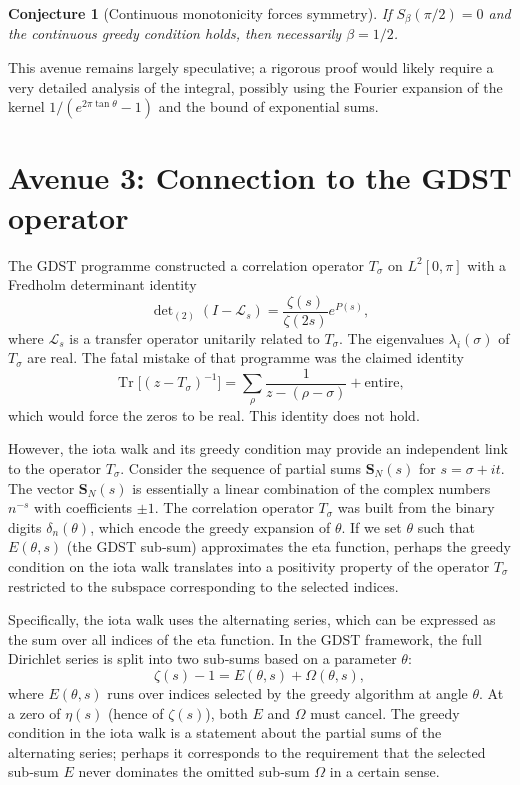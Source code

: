 \documentclass[11pt,a4paper]{article}
\newtheorem{conjecture}[theorem]{Conjecture}
\newcommand{\Tr}{\operatorname{Tr}}
\begin{document}
\begin{conjecture}[Continuous monotonicity forces symmetry]\label{conj:cont}
If $S_\beta(\pi/2) = 0$ and the continuous greedy condition holds, then necessarily $\beta = 1/2$.
\end{conjecture}

This avenue remains largely speculative; a rigorous proof would likely require a very detailed analysis of the integral, possibly using the Fourier expansion of the kernel $1/(e^{2\pi\tan\theta}-1)$ and the bound of exponential sums.

\section{Avenue 3: Connection to the GDST operator}
\label{sec:GDST}

The GDST programme constructed a correlation operator $T_\sigma$ on $L^2[0,\pi]$ with a Fredholm determinant identity
\[
\det\nolimits_{(2)}(I - \mathcal{L}_s) = \frac{\zeta(s)}{\zeta(2s)} e^{P(s)},
\]
where $\mathcal{L}_s$ is a transfer operator unitarily related to $T_\sigma$.  The eigenvalues $\lambda_i(\sigma)$ of $T_\sigma$ are real.  The fatal mistake of that programme was the claimed identity
\[
\Tr\bigl[ (z - T_\sigma)^{-1} \bigr] = \sum_{\rho} \frac{1}{z - (\rho-\sigma)} + \text{entire},
\]
which would force the zeros to be real.  This identity does not hold.

However, the iota walk and its greedy condition may provide an independent link to the operator $T_\sigma$.  Consider the sequence of partial sums $\mathbf{S}_N(s)$ for $s = \sigma + it$.  The vector $\mathbf{S}_N(s)$ is essentially a linear combination of the complex numbers $n^{-s}$ with coefficients $\pm 1$.  The correlation operator $T_\sigma$ was built from the binary digits $\delta_n(\theta)$, which encode the greedy expansion of $\theta$.  If we set $\theta$ such that $E(\theta,s)$ (the GDST sub‑sum) approximates the eta function, perhaps the greedy condition on the iota walk translates into a positivity property of the operator $T_\sigma$ restricted to the subspace corresponding to the selected indices.

Specifically, the iota walk uses the alternating series, which can be expressed as the sum over all indices of the eta function.  In the GDST framework, the full Dirichlet series is split into two sub‑sums based on a parameter $\theta$:
\[
\zeta(s) - 1 = E(\theta,s) + \Omega(\theta,s),
\]
where $E(\theta,s)$ runs over indices selected by the greedy algorithm at angle $\theta$.  At a zero of $\eta(s)$ (hence of $\zeta(s)$), both $E$ and $\Omega$ must cancel.  The greedy condition in the iota walk is a statement about the partial sums of the alternating series; perhaps it corresponds to the requirement that the selected sub‑sum $E$ never dominates the omitted sub‑sum $\Omega$ in a certain sense.
\end{document}
